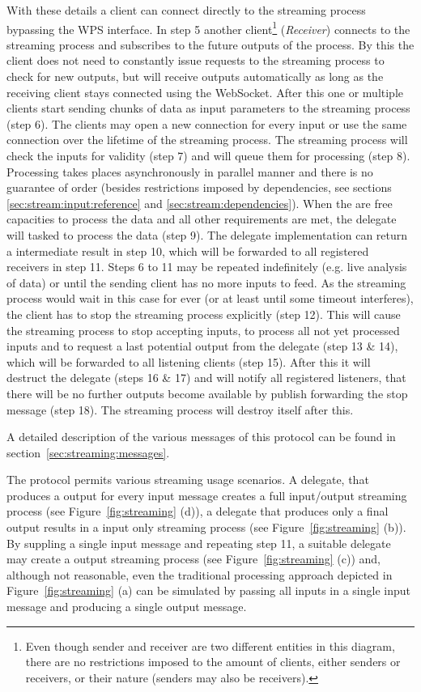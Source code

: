 	With these details a client can connect directly to the streaming process bypassing the \ac{WPS} interface. In step 5 another client\footnote{Even though sender and receiver are two different entities in this diagram, there are no restrictions imposed to the amount of clients, either senders or receivers, or their nature (senders may also be receivers).} (\emph{Receiver}) connects to the streaming process and subscribes to the future outputs of the process. By this the client does not need to constantly issue requests to the streaming process to check for new outputs, but will receive outputs automatically as long as the receiving client stays connected using the WebSocket.
	After this one or multiple clients start sending chunks of data as input parameters to the streaming process (step 6). The clients may open a new connection for every input or use the same connection over the lifetime of the streaming process. The streaming process will check the inputs for validity (step 7) and will queue them for processing (step 8).
	Processing takes places asynchronously in parallel manner and there is no guarantee of order (besides restrictions imposed by dependencies, see sections \ref{sec:stream:input:reference} and \ref{sec:stream:dependencies}). When the are free capacities to process the data and all other requirements are met, the delegate will tasked to process the data (step 9). The delegate implementation can return a intermediate result in step 10, which will be forwarded to all registered receivers in step 11.
	Steps 6 to 11 may be repeated indefinitely (e.g. live analysis of data) or until the sending client has no more inputs to feed. As the streaming process would wait in this case for ever (or at least until some timeout interferes), the client has to stop the streaming process explicitly (step 12).
	This will cause the streaming process to stop accepting inputs, to process all not yet processed inputs and to request a last potential output from the delegate (step 13 \& 14), which will be forwarded to all listening clients (step 15). After this it will destruct the delegate (steps 16 \& 17) and will notify all registered listeners, that there will be no further outputs become available by publish forwarding the stop message (step 18). The streaming process will destroy itself after this.

	A detailed description of the various messages of this protocol can be found in section~\ref{sec:streaming:messages}.

	The protocol permits various streaming usage scenarios. A delegate, that produces a output for every input message creates a full input/output streaming process (see Figure~\ref{fig:streaming} (d)), a delegate that produces only a final output results in a input only streaming process (see Figure~\ref{fig:streaming} (b)). By suppling a single input message and repeating step 11, a suitable delegate may create a output streaming process (see Figure~\ref{fig:streaming} (c)) and, although not reasonable, even the traditional processing approach depicted in Figure~\ref{fig:streaming} (a) can be simulated by passing all inputs in a single input message and producing a single output message.

